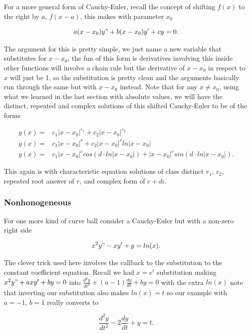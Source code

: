 \documentclass[12pt]{article}
\begin{document}
For a more general form of Cauchy-Euler, recall the concept of shifting $f(x)$ to the right by $a$, $f(x-a)$, this makes with parameter $x_0$

\begin{equation*}
    a(x-x_0)y"+b(x-x_0)y'+cy = 0.
\end{equation*}

The argument for this is pretty simple, we just name a new variable that substitutes for $x-x_0$, the fun of this form is derivatives involving this inside other functions will involve a chain rule but the derivative of $x-x_0$ in respect to $x$ will just be 1, so the substitution is pretty clean and the arguments basically run through the same but with $x-x_0$ instead. Note that for any $x\neq x_0$, using what we learned in the last section with absolute values, we will have the distinct, repeated and complex solutions of this shifted Cauchy-Euler to be of the forms

\begin{align*}
    y(x) =& c_1|x-x_0|^{r_1}+c_2|x-x_0|^{r_2} \\
    y(x) =& c_1|x-x_0|^{r}+c_2|x-x_0|^{r}ln|x-x_0| \\
    y(x) =& c_1|x-x_0|^{c}cos(d\cdot ln|x-x_0|)+|x-x_0|^{c}sin(d\cdot ln|x-x_0|).
\end{align*}

This again is with characteristic equation solutions of class distinct $r_1$, $r_2$, repeated root answer of $r$, and complex form of $c+di$.

\subsubsection{Nonhonogeneous}

For one more kind of curve ball consider a Cauchy-Euler but with a non-zero right side

\begin{equation*}
    x^2y"-xy'+y=ln(x).
\end{equation*}

The clever trick used here involves the callback to the substitution to the constant coefficient equation. Recall we had $x=e^t$ substitution making $x^2y"+axy'+by=0$ into $\frac{d^2y}{dt^2}+(a-1)\frac{dy}{dt}+by=0$ with the extra $ln(x)$ note that inverting our substitution also makes $ln(x)=t$ so our example with $a=-1$, $b=1$ really converts to

\begin{equation*}
    \frac{d^2y}{dt^2}-2\frac{dy}{dt}+y=t.
\end{equation*}
\end{document}
